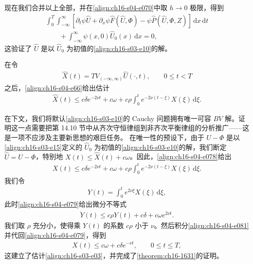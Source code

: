 ﻿\documentclass[../../main.tex]{subfiles}
\begin{document}
现在我们合并以上全部，并在\eqref{align:ch16-s04-e070}中取 $h\to0$ 极限，得到
\begin{align}
\int_0^T\int_{-\infty}^{\infty}[\partial_t\psi\hat U+\partial_x\psi\hat F(\hat U,\Phi)-\psi\hat P(\hat U,\Phi,Z)]\,\mathrm{d}x\,\mathrm{d}t\nonumber\\
\qquad+\int_{-\infty}^{\infty}\psi(x,0)\hat U_0(x)\,\mathrm{d}x=0,
\label{align:ch16-s04-e076}
\end{align}
这验证了 $\hat U$ 是以 $\hat U_0$ 为初值的\eqref{align:ch16-s03-e10}的解。

在令
\begin{align}
\hat X(t)=TV_{(-\infty,\infty)}\hat U(\cdot,t),\qquad 0\leqslant t<T
\label{align:ch16-s04-e077}
\end{align}
之后，\eqref{align:ch16-s04-e66}给出估计
\begin{align}
\hat X(t)\leqslant c\delta e^{-2\nu t}+c\omega+c\rho\int_0^t e^{-2\nu(t-\xi)}X(\xi)\,\mathrm{d}\xi.
\label{align:ch16-s04-e078}
\end{align}

在下文，我们将默认\eqref{align:ch16-s03-e10}的 Cauchy 问题拥有唯一可容 $BV$ 解。证明这一点需要把第 14.10 节中从齐次守恒律组到非齐次平衡律组的分析推广——这是一项不应涉及主要新思想的艰巨任务。
在唯一性的预设下，由于 $U-\Phi$ 是以\eqref{align:ch16-s03-e15}定义的 $\hat U_0$ 为初值的\eqref{align:ch16-s03-e10}的解，我们断定 $\hat U=U-\Phi$，特别地 $X(t)\leqslant\hat X(t)+c\omega$。因此，\eqref{align:ch16-s04-e078}给出
\begin{align}
X(t)\leqslant c\delta e^{-2\nu t}+c\omega+c\rho\int_0^t e^{-2\nu(t-\xi)}X(\xi)\,\mathrm{d}\xi.
\label{align:ch16-s04-e079}
\end{align}
我们令
\begin{align}
Y(t)=\int_0^t e^{2\nu\xi}X(\xi)\,\mathrm{d}\xi,
\label{align:ch16-s04-e080}
\end{align}
此时\eqref{align:ch16-s04-e079}给出微分不等式
\begin{align}
\dot Y(t)\leqslant c\rho Y(t)+c\delta+c\omega e^{2\nu t}.
\label{align:ch16-s04-e081}
\end{align}
我们取 $\rho$ 充分小，使得乘 $Y(t)$ 的系数 $c\rho$ 小于 $\nu$。然后积分\eqref{align:ch16-s04-e081}并代回\eqref{align:ch16-s04-e079}，得到
\begin{align}
X(t)\leqslant c\omega+c\delta e^{-\nu t},\qquad 0\leqslant t\leqslant T,
\label{align:ch16-s04-e082}
\end{align}
这建立了估计\eqref{align:ch16-s03-e03}，并完成了\cref{theorem:ch16-1631}的证明。
\end{document}
